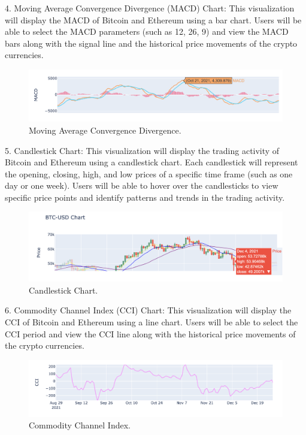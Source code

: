 \documentclass[10pt,twocolumn,a4paper]{article}
\begin{document}
4. Moving Average Convergence Divergence (MACD) Chart: This visualization will display the MACD of Bitcoin and Ethereum using a bar chart. Users will be able to select the MACD parameters (such as 12, 26, 9) and view the MACD bars along with the signal line and the historical price movements of the crypto currencies.
\begin{figure}[!h]
  \centering
  \includegraphics[width=1\linewidth]{MACD.png}
  \caption{Moving Average Convergence Divergence.}
  \label{fig:example}
\end{figure}

5. Candlestick Chart: This visualization will display the trading activity of Bitcoin and Ethereum using a candlestick chart. Each candlestick will represent the opening, closing, high, and low prices of a specific time frame (such as one day or one week). Users will be able to hover over the candlesticks to view specific price points and identify patterns and trends in the trading activity.
\begin{figure}[!h]
  \centering
  \includegraphics[width=1\linewidth]{Candlestick.png}
  \caption{Candlestick Chart.}
  \label{fig:example}
\end{figure}


6. Commodity Channel Index (CCI) Chart: This visualization will display the CCI of Bitcoin and Ethereum using a line chart. Users will be able to select the CCI period and view the CCI line along with the historical price movements of the crypto currencies.
\begin{figure}[!h]
  \centering
  \includegraphics[width=1\linewidth]{CCI.png}
  \caption{Commodity Channel Index.}
  \label{fig:example}
\end{figure}
\end{document}
